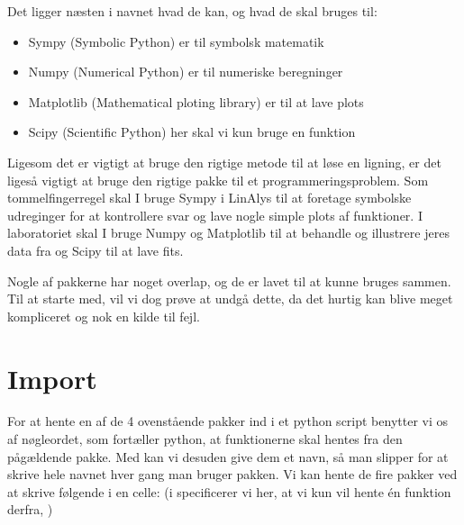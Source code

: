 \documentclass[letterpaper,10pt,english]{jupyterBook}
\begin{document}
Det ligger næsten i navnet hvad de kan, og hvad de skal bruges til:
\begin{itemize}
\item {} 
Sympy (Symbolic Python) er til symbolsk matematik

\item {} 
Numpy (Numerical Python) er til numeriske beregninger

\item {} 
Matplotlib (Mathematical ploting library) er til at lave plots

\item {} 
Scipy (Scientific Python) her skal vi kun bruge en funktion

\end{itemize}

Ligesom det er vigtigt at bruge den rigtige metode til at løse en ligning, er det ligeså vigtigt at bruge den rigtige pakke til et programmeringsproblem. Som tommelfingerregel skal I bruge Sympy i LinAlys til at foretage symbolske udreginger for at kontrollere svar og lave nogle simple plots af funktioner. I laboratoriet skal I bruge Numpy og Matplotlib til at behandle og illustrere jeres data fra og Scipy til at lave fits.

Nogle af pakkerne har noget overlap, og de er lavet til at kunne bruges sammen. Til at starte med, vil vi dog prøve at undgå dette, da det hurtig kan blive meget kompliceret og nok en kilde til fejl.


\section{Import}
\label{\detokenize{notebooks/Intro_til_pakker:import}}
For at hente en af de 4 ovenstående pakker ind i et python script benytter vi os af  nøgleordet, som fortæller python, at funktionerne skal hentes fra den pågældende pakke. Med  kan vi desuden give dem et navn, så man slipper for at skrive hele navnet hver gang man bruger pakken. Vi kan hente de fire pakker ved at skrive følgende i en celle: (i  specificerer vi her, at vi kun vil hente én funktion derfra, )

\begin{sphinxVerbatim}[commandchars=\\\{\}]
   
   
   
   
\end{sphinxVerbatim}
\end{document}
